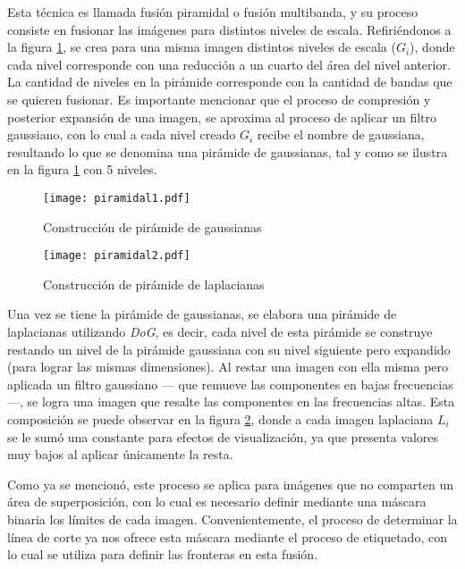 Esta técnica es llamada fusión piramidal o fusión multibanda, y su proceso consiste en fusionar las imágenes para distintos niveles de escala. Refiriéndonos a la figura \ref{imagen:piramidal1}, se crea para una misma imagen distintos niveles de escala ($G_i$), donde cada nivel corresponde con una reducción a un cuarto del área del nivel anterior. La cantidad de niveles en la pirámide corresponde con la cantidad de bandas que se quieren fusionar. Es importante mencionar que el proceso de compresión y posterior expansión de una imagen, se aproxima al proceso de aplicar un filtro gaussiano, con lo cual a cada nivel creado $G_i$ recibe el nombre de gaussiana, resultando lo que se denomina una pirámide de gaussianas, tal y como se ilustra en la figura \ref{imagen:piramidal1} con 5 niveles.

\begin{figure}[h]
	\centering
	\texttt{[image: piramidal1.pdf]}
	\caption[Construcción de pirámide de gaussianas]{Construcción de pirámide de gaussianas}
	\label{imagen:piramidal1}
\end{figure}

\begin{figure}[h]
	\centering
	\texttt{[image: piramidal2.pdf]}
	\caption[Construcción de pirámide de laplacianas]{Construcción de pirámide de laplacianas}
	\label{imagen:piramidal2}
\end{figure}

Una vez se tiene la pirámide de gaussianas, se elabora una pirámide de laplacianas utilizando \textit{DoG}, es decir, cada nivel de esta pirámide se construye restando un nivel de la pirámide gaussiana con su nivel siguiente pero expandido (para lograr las mismas dimensiones). Al restar una imagen con ella misma pero aplicada un filtro gaussiano --- que remueve las componentes en bajas frecuencias ---, se logra una imagen que resalte las componentes en las frecuencias altas. Esta composición se puede observar en la figura \ref{imagen:piramidal2}, donde a cada imagen laplaciana $L_i$ se le sumó una constante para efectos de visualización, ya que presenta valores muy bajos al aplicar únicamente la resta.

Como ya se mencionó, este proceso se aplica para imágenes que no comparten un área de superposición, con lo cual es necesario definir mediante una máscara binaria los límites de cada imagen. Convenientemente, el proceso de determinar la línea de corte ya nos ofrece esta máscara mediante el proceso de etiquetado, con lo cual se utiliza para definir las fronteras en esta fusión.

